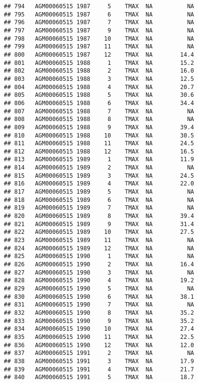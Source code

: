 \documentclass{article}\usepackage[]{graphicx}\usepackage[]{color}
\makeatletter
\newenvironment{kframe}{%
 \def\at@end@of@kframe{}%
 \ifinner\ifhmode%
  \def\at@end@of@kframe{\end{minipage}}%
  \begin{minipage}{\columnwidth}%
 \fi\fi%
 \def\FrameCommand##1{\hskip\@totalleftmargin \hskip-\fboxsep
 \colorbox{shadecolor}{##1}\hskip-\fboxsep
     \hskip-\linewidth \hskip-\@totalleftmargin \hskip\columnwidth}%
 \MakeFramed {\advance\hsize-\width
   \@totalleftmargin\z@ \linewidth\hsize
   \@setminipage}}%
 {\par\unskip\endMakeFramed%
 \at@end@of@kframe}
\newenvironment{knitrout}{}{} %
\makeatother
\begin{document}
\begin{knitrout}
\begin{kframe}
\begin{verbatim}
## 794   AGM00060515 1987     5    TMAX  NA          NA
## 795   AGM00060515 1987     6    TMAX  NA          NA
## 796   AGM00060515 1987     7    TMAX  NA          NA
## 797   AGM00060515 1987     9    TMAX  NA          NA
## 798   AGM00060515 1987    10    TMAX  NA          NA
## 799   AGM00060515 1987    11    TMAX  NA          NA
## 800   AGM00060515 1987    12    TMAX  NA        14.4
## 801   AGM00060515 1988     1    TMAX  NA        15.2
## 802   AGM00060515 1988     2    TMAX  NA        16.0
## 803   AGM00060515 1988     3    TMAX  NA        12.5
## 804   AGM00060515 1988     4    TMAX  NA        20.7
## 805   AGM00060515 1988     5    TMAX  NA        30.6
## 806   AGM00060515 1988     6    TMAX  NA        34.4
## 807   AGM00060515 1988     7    TMAX  NA          NA
## 808   AGM00060515 1988     8    TMAX  NA          NA
## 809   AGM00060515 1988     9    TMAX  NA        39.4
## 810   AGM00060515 1988    10    TMAX  NA        30.5
## 811   AGM00060515 1988    11    TMAX  NA        24.5
## 812   AGM00060515 1988    12    TMAX  NA        16.5
## 813   AGM00060515 1989     1    TMAX  NA        11.9
## 814   AGM00060515 1989     2    TMAX  NA          NA
## 815   AGM00060515 1989     3    TMAX  NA        24.5
## 816   AGM00060515 1989     4    TMAX  NA        22.0
## 817   AGM00060515 1989     5    TMAX  NA          NA
## 818   AGM00060515 1989     6    TMAX  NA          NA
## 819   AGM00060515 1989     7    TMAX  NA          NA
## 820   AGM00060515 1989     8    TMAX  NA        39.4
## 821   AGM00060515 1989     9    TMAX  NA        31.4
## 822   AGM00060515 1989    10    TMAX  NA        27.5
## 823   AGM00060515 1989    11    TMAX  NA          NA
## 824   AGM00060515 1989    12    TMAX  NA          NA
## 825   AGM00060515 1990     1    TMAX  NA          NA
## 826   AGM00060515 1990     2    TMAX  NA        16.4
## 827   AGM00060515 1990     3    TMAX  NA          NA
## 828   AGM00060515 1990     4    TMAX  NA        19.2
## 829   AGM00060515 1990     5    TMAX  NA          NA
## 830   AGM00060515 1990     6    TMAX  NA        38.1
## 831   AGM00060515 1990     7    TMAX  NA          NA
## 832   AGM00060515 1990     8    TMAX  NA        35.2
## 833   AGM00060515 1990     9    TMAX  NA        35.2
## 834   AGM00060515 1990    10    TMAX  NA        27.4
## 835   AGM00060515 1990    11    TMAX  NA        22.5
## 836   AGM00060515 1990    12    TMAX  NA        12.0
## 837   AGM00060515 1991     2    TMAX  NA          NA
## 838   AGM00060515 1991     3    TMAX  NA        17.9
## 839   AGM00060515 1991     4    TMAX  NA        21.7
## 840   AGM00060515 1991     5    TMAX  NA        18.7

\end{verbatim}
\end{kframe}
\end{knitrout}
\end{document}

